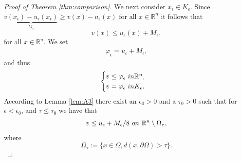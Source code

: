 \documentclass[10pt,a4paper]{amsart}
\providecommand{\Rn}{\mathbb{R}^n}
\begin{document}
\begin{proof}[Proof of Theorem \ref{thm:comparison}]
We next consider $x_{\epsilon} \in K_{\epsilon}$. Since $\underbrace{v(x_{\epsilon})-u_{\epsilon}(x_{\epsilon})}_{M_{\epsilon}} \geq v(x)-u_{\epsilon}(x)$ for all $x \in \Rn$ it follows that
$$
v(x) \leq u_{\epsilon}(x)+M_{\epsilon},
$$
for all $x \in \Rn$.
We set
\begin{align*}
 \varphi_{\epsilon} =  u_{\epsilon}+M_{\epsilon},
\end{align*}
and thus
\begin{align}
     \begin{cases}
                 v \leq  \varphi_{\epsilon}  \ \textup{ in  } \Rn, \\
                 v = \varphi_{\epsilon} \ \textup{ in  }  K_{\epsilon}.
     \end{cases}
\end{align}
According to Lemma \ref{lem:A3} there exist an $\epsilon_0>0$ and a $\tau_0 >0$ such that for $\epsilon < \epsilon_0$, and $\tau \leq \tau_0$ we have that
\begin{equation}
\label{eq:blahblah}
v \leq u_{\epsilon} + M_{\epsilon}/8 \ \textup{ on } \ \Rn \setminus \Omega_{\tau},   
\end{equation}
where
$$
\Omega_{\tau}:= \{ x \in \Omega, d(x, \partial \Omega)> \tau \}. 
$$

 


\end{proof}
\end{document}
